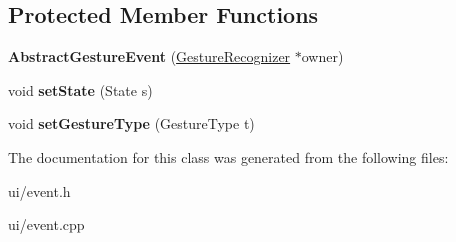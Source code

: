 \subsection*{Protected Member Functions}
\begin{DoxyCompactItemize}
\item 
\hypertarget{class_tempest_1_1_abstract_gesture_event_a3f3fa312a143aa76066a58f2b7472196}{{\bfseries Abstract\+Gesture\+Event} (\hyperlink{class_tempest_1_1_gesture_recognizer}{Gesture\+Recognizer} $\ast$owner)}\label{class_tempest_1_1_abstract_gesture_event_a3f3fa312a143aa76066a58f2b7472196}

\item 
\hypertarget{class_tempest_1_1_abstract_gesture_event_a19c364480a3a7cc38eacc5f4a2c69b58}{void {\bfseries set\+State} (State s)}\label{class_tempest_1_1_abstract_gesture_event_a19c364480a3a7cc38eacc5f4a2c69b58}

\item 
\hypertarget{class_tempest_1_1_abstract_gesture_event_a274dfad490043c6bcaa84697545f1f69}{void {\bfseries set\+Gesture\+Type} (Gesture\+Type t)}\label{class_tempest_1_1_abstract_gesture_event_a274dfad490043c6bcaa84697545f1f69}

\end{DoxyCompactItemize}


The documentation for this class was generated from the following files\+:\begin{DoxyCompactItemize}
\item 
ui/event.\+h\item 
ui/event.\+cpp\end{DoxyCompactItemize}
